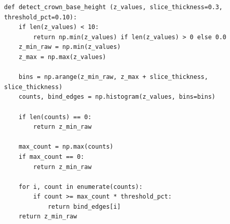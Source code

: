 \begin{lstlisting}[label={lst:crown_base_height}, caption={[Kronenansatzhöhe]Histogrammbasierte Bestimmung der Kronenansatzhöhe aus der 3D-Punktwolke}, breaklines=true, breakatwhitespace=true]
def detect_crown_base_height (z_values, slice_thickness=0.3, threshold_pct=0.10):
    if len(z_values) < 10:
        return np.min(z_values) if len(z_values) > 0 else 0.0
    z_min_raw = np.min(z_values)
    z_max = np.max(z_values)

    bins = np.arange(z_min_raw, z_max + slice_thickness, slice_thickness)
    counts, bind_edges = np.histogram(z_values, bins=bins)

    if len(counts) == 0:
        return z_min_raw
    
    max_count = np.max(counts)
    if max_count == 0:
        return z_min_raw
    
    for i, count in enumerate(counts):
        if count >= max_count * threshold_pct:
            return bind_edges[i]
    return z_min_raw
\end{lstlisting}